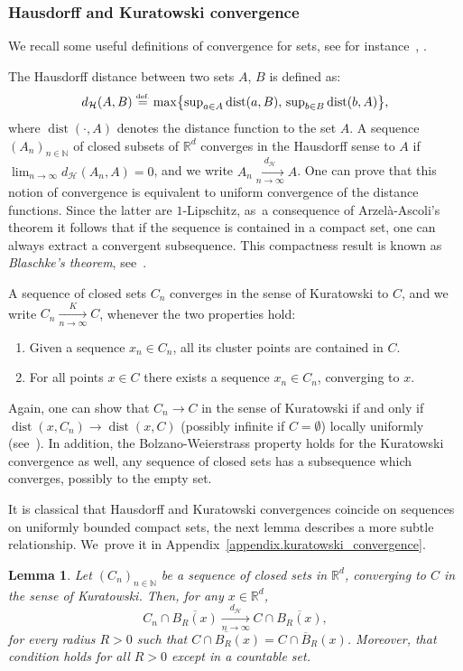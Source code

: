 \documentclass[10pt]{amsart}
\let\ts\textstyle
\newtheorem{lemma}[theorem]{Lemma}
\theoremstyle{definition}
\newcommand{\eqdef}{\ensuremath{\stackrel{\mbox{\upshape\tiny def.}}{=}}}
\newcommand{\RR}{\mathbb{R}}
\DeclareMathOperator{\dist}{dist}
\newcommand{\distH}{d_{\mathcal{H}}}
\begin{document}

\subsubsection{Hausdorff and Kuratowski convergence}\label{subsection.Hausdorff_Kuratoski}
We recall some useful definitions of convergence for sets, see for instance~\cite[Chap.\,4]{rockafellar2009variational}, \cite[Chap.\,6]{ambrosio2000functions}.

The Hausdorff distance between two sets $A$, $B$ is defined
as:
\begin{equation}
\label{hausdorff.distance}
\distH(A,B) \eqdef \max\bigl\{\ts
\sup_{a \in A} \dist(a, B),\, \sup_{b \in B} \dist(b, A)
\bigr\},
\end{equation}
where $\dist(\cdot, A)$ denotes the distance function to the set $A$.
A sequence $\left(A_n\right)_{n \in \mathbb{N}}$ of closed subsets of $\RR^d$ converges in the Hausdorff sense to $A$ if $\lim_{n\to\infty} \distH(A_n, A)=0$, and we write $A_n \xrightarrow[n \to \infty]{\distH} A$.
One can prove that this notion of convergence is equivalent to uniform convergence of the distance functions. Since the latter are $1$-Lipschitz, as~a consequence of Arzelà-Ascoli's theorem it follows that if the sequence is contained in a compact set, one can always extract a convergent subsequence. This compactness result is known as \emph{Blaschke's theorem}, see~\cite[Th.\,6.1]{ambrosio2000functions}.

A sequence of closed sets $C_n$ converges in the sense of Kuratowski to $C$, and we write $C_n \xrightarrow[n \to \infty]{K} C$, whenever the two properties hold:
\begin{enumerate}
\item Given a sequence $x_n \in C_n$, all its cluster points are contained in $C$.
\item For all points $x\in C$ there exists a sequence $x_n \in C_n$, converging to $x$.
\end{enumerate}
Again, one can show that $C_n\to C$ in the sense of Kuratowski
if and only if $\dist(x,C_n)\to\dist(x,C)$ (possibly infinite if $C=\emptyset$) locally uniformly (see~\cite[Cor.\,4.7]{rockafellar2009variational}). In addition, the Bolzano-Weierstrass property holds for the Kuratowski convergence as well, \ie any sequence of closed sets has a subsequence which converges, possibly to the empty set.

It is classical that Hausdorff and Kuratowski convergences coincide on sequences on uniformly bounded compact sets, the next lemma describes a more subtle relationship. We~prove it in Appendix~\ref{appendix.kuratowski_convergence}.
\begin{lemma}\label{lemma.localized_Kuratowski}
Let $(C_n)_{n \in \mathbb{N}}$ be a sequence of closed sets in $\RR^d$, converging to $C$ in the sense of Kuratowski.
Then, for any $x \in \RR^d$,
\[
C_n\cap\overline{B_R(x)}
\xrightarrow[n \to \infty]{\distH}
C\cap\overline{B_R(x)},
\]
for every radius $R>0$ such that $\overline{C\cap B_R(x)} = C\cap \overline{B}_R(x)$. Moreover, that condition holds for all $R>0$ except in a countable set.
\end{lemma}
\end{document}
